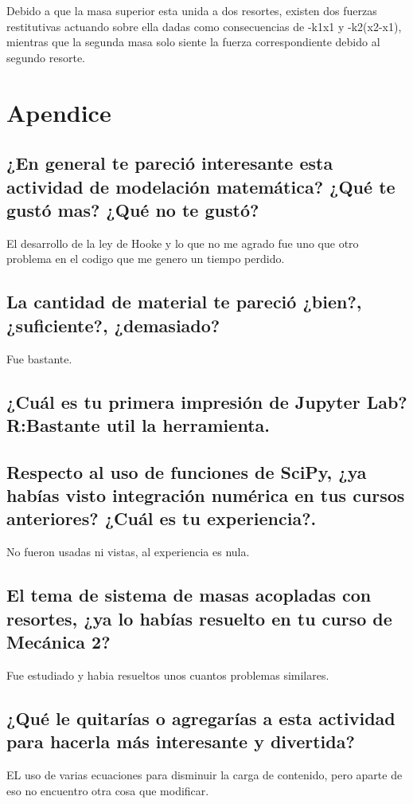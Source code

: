 \documentclass{article}
\begin{document}
Debido a que la masa superior esta unida a dos resortes, existen dos fuerzas restitutivas actuando sobre ella dadas como consecuencias de -k1x1 y -k2(x2-x1), mientras que la segunda masa solo siente la fuerza correspondiente debido al segundo resorte.
\section{Apendice}
\subsection{¿En general te pareció interesante esta actividad de modelación matemática? ¿Qué te gustó mas? ¿Qué no te gustó?}
El desarrollo de la ley de Hooke y lo que no me agrado fue uno que otro problema en el codigo que me genero un tiempo perdido.
\subsection{La cantidad de material te pareció ¿bien?, ¿suficiente?, ¿demasiado?}
 Fue bastante.
\subsection{¿Cuál es tu primera impresión de Jupyter Lab? R:Bastante util la herramienta.}
\subsection{Respecto al uso de funciones de SciPy, ¿ya habías visto integración numérica en tus cursos anteriores? ¿Cuál es tu experiencia?.}
No fueron usadas ni vistas, al experiencia es nula.
\subsection{El tema de sistema de masas acopladas con resortes, ¿ya lo habías resuelto en tu curso de Mecánica 2?}
Fue estudiado y habia resueltos unos cuantos problemas similares.
\subsection{¿Qué le quitarías o agregarías a esta actividad para hacerla más interesante y divertida?}
EL uso de varias ecuaciones para disminuir la carga de contenido, pero aparte de eso no encuentro otra cosa que modificar.
\end{document}
